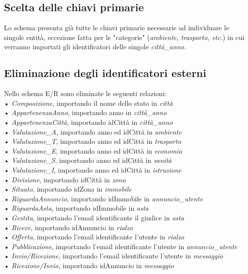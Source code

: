 \documentclass[a4paper,12pt]{report}
\begin{document}
            \subsection*{Scelta delle chiavi primarie}
            Lo schema presenta già tutte le chiavi primarie necessarie ad individuare le singole entità, eccezione fatta
            per le "categorie" (\textit{ambiente, trasporto, etc.}) in cui verranno importati gli identificatori delle 
            singole \textit{città\_anno}.

            \subsection*{Eliminazione degli identificatori esterni}
            Nello schema E/R sono eliminate le seguenti relazioni: \\
            • \textit{Composizione}, importando il nome dello stato in \textit{città} \\
            • \textit{AppartenenzaAnno}, importando anno in \textit{città\_anno} \\
            • \textit{AppartenenzaCittà}, importando idCittà in \textit{città\_anno} \\
            • \textit{Valutazione\_A}, importando anno ed idCittà in \textit{ambiente} \\
            • \textit{Valutazione\_T}, importando anno ed idCittà in \textit{trasporto} \\
            • \textit{Valutazione\_E}, importando anno ed idCittà in \textit{economia} \\
            • \textit{Valutazione\_S}, importando anno ed idCittà in \textit{sanità} \\
            • \textit{Valutazione\_I}, importando anno ed idCittà in \textit{istruzione} \\
            • \textit{Divisione}, importando idCittà in \textit{zona} \\
            • \textit{Situato}, importando idZona in \textit{immobile} \\
            • \textit{RiguardaAnnuncio}, importando idImmobile in \textit{annuncio\_utente} \\
            • \textit{RiguardaAsta}, importando idImmobile in \textit{asta} \\
            • \textit{Gestita}, importando l'email identificante il giudice in \textit{asta} \\
            • \textit{Riceve}, importando idAnnuncio in \textit{rialzo} \\
            • \textit{Offerta}, importando l'email identificante l'utente in \textit{rialzo} \\
            • \textit{Pubblicazione}, importando l'email identificante l'utente in \textit{annuncio\_utente} \\
            • \textit{Invio/Ricezione}, importando l'email identificante l'utente in \textit{messaggio} \\
            • \textit{Ricezione/Invio}, importando idAnnuncio in \textit{messaggio} \\
\end{document}
